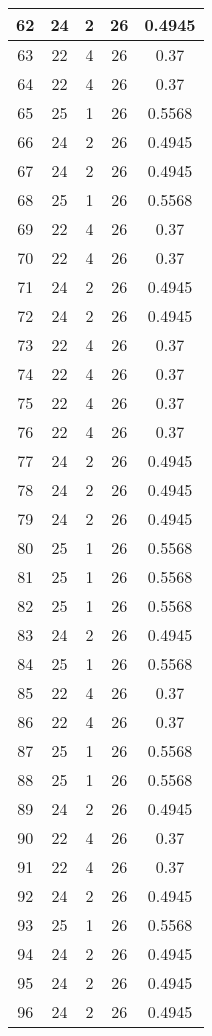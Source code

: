 \documentclass[letterpaper, 12pt]{article}
\begin{document}
\begin{longtable}{|c|c|c|c|c|}
\hline
62 & 24 & 2 & 26 & 0.4945 \\
\hline
63 & 22 & 4 & 26 & 0.37 \\
\hline
64 & 22 & 4 & 26 & 0.37 \\
\hline
65 & 25 & 1 & 26 & 0.5568 \\
\hline
66 & 24 & 2 & 26 & 0.4945 \\
\hline
67 & 24 & 2 & 26 & 0.4945 \\
\hline
68 & 25 & 1 & 26 & 0.5568 \\
\hline
69 & 22 & 4 & 26 & 0.37 \\
\hline
70 & 22 & 4 & 26 & 0.37 \\
\hline
71 & 24 & 2 & 26 & 0.4945 \\
\hline
72 & 24 & 2 & 26 & 0.4945 \\
\hline
73 & 22 & 4 & 26 & 0.37 \\
\hline
74 & 22 & 4 & 26 & 0.37 \\
\hline
75 & 22 & 4 & 26 & 0.37 \\
\hline
76 & 22 & 4 & 26 & 0.37 \\
\hline
77 & 24 & 2 & 26 & 0.4945 \\
\hline
78 & 24 & 2 & 26 & 0.4945 \\
\hline
79 & 24 & 2 & 26 & 0.4945 \\
\hline
80 & 25 & 1 & 26 & 0.5568 \\
\hline
81 & 25 & 1 & 26 & 0.5568 \\
\hline
82 & 25 & 1 & 26 & 0.5568 \\
\hline
83 & 24 & 2 & 26 & 0.4945 \\
\hline
84 & 25 & 1 & 26 & 0.5568 \\
\hline
85 & 22 & 4 & 26 & 0.37 \\
\hline
86 & 22 & 4 & 26 & 0.37 \\
\hline
87 & 25 & 1 & 26 & 0.5568 \\
\hline
88 & 25 & 1 & 26 & 0.5568 \\
\hline
89 & 24 & 2 & 26 & 0.4945 \\
\hline
90 & 22 & 4 & 26 & 0.37 \\
\hline
91 & 22 & 4 & 26 & 0.37 \\
\hline
92 & 24 & 2 & 26 & 0.4945 \\
\hline
93 & 25 & 1 & 26 & 0.5568 \\
\hline
94 & 24 & 2 & 26 & 0.4945 \\
\hline
95 & 24 & 2 & 26 & 0.4945 \\
\hline
96 & 24 & 2 & 26 & 0.4945 \\

\end{longtable}
\end{document}
